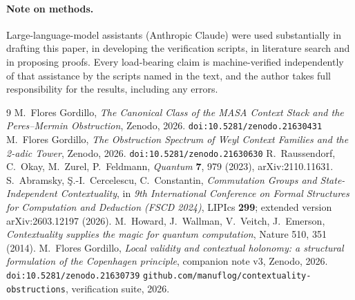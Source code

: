\documentclass[11pt]{article}
\theoremstyle{remark}
\theoremstyle{plain}
\begin{document}
\paragraph{Note on methods.} Large-language-model assistants (Anthropic Claude) were used
substantially in drafting this paper, in developing the verification scripts, in literature
search and in proposing proofs. Every load-bearing claim is machine-verified independently
of that assistance by the scripts named in the text, and the author takes full
responsibility for the results, including any errors.

\begin{thebibliography}{9}
 M.~Flores Gordillo, \emph{The Canonical Class of the MASA Context Stack
and the Peres--Mermin Obstruction}, Zenodo, 2026. \texttt{doi:10.5281/zenodo.21630431}
 M.~Flores Gordillo, \emph{The Obstruction Spectrum of Weyl Context
Families and the 2-adic Tower}, Zenodo, 2026. \texttt{doi:10.5281/zenodo.21630630}
 R.~Raussendorf, C.~Okay, M.~Zurel, P.~Feldmann,
\emph{Quantum} \textbf{7}, 979 (2023), arXiv:2110.11631.
 S.~Abramsky, \c{S}.-I.~Cercelescu, C.~Constantin, \emph{Commutation Groups and
State-Independent Contextuality}, in \emph{9th International Conference on Formal Structures for
Computation and Deduction (FSCD 2024)}, LIPIcs \textbf{299}; extended version arXiv:2603.12197
(2026).
 M.~Howard, J.~Wallman, V.~Veitch, J.~Emerson, \emph{Contextuality supplies the magic for quantum computation}, Nature 510, 351 (2014).
 M.~Flores Gordillo, \emph{Local validity and contextual holonomy: a structural
formulation of the Copenhagen principle}, companion note v3, Zenodo, 2026.
\texttt{doi:10.5281/zenodo.21630739}
 \texttt{github.com/manuflog/contextuality-obstructions}, verification
suite, 2026.
\end{thebibliography}
\end{document}
